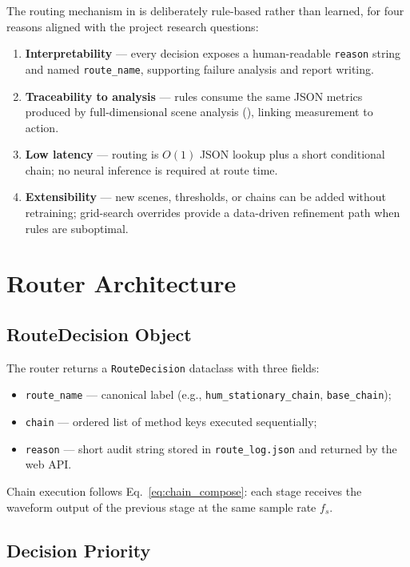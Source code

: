 The routing mechanism in \projectshort{} is deliberately rule-based rather than learned, for four reasons aligned with the project research questions:
\begin{enumerate}
  \item \textbf{Interpretability} --- every decision exposes a human-readable \texttt{reason} string and named \texttt{route\_name}, supporting failure analysis and report writing.
  \item \textbf{Traceability to analysis} --- rules consume the same JSON metrics produced by full-dimensional scene analysis (), linking measurement to action.
  \item \textbf{Low latency} --- routing is $O(1)$ JSON lookup plus a short conditional chain; no neural inference is required at route time.
  \item \textbf{Extensibility} --- new scenes, thresholds, or chains can be added without retraining; grid-search overrides provide a data-driven refinement path when rules are suboptimal.
\end{enumerate}

\section{Router Architecture}
\label{sec:router_arch}

\subsection{RouteDecision Object}

The router returns a \texttt{RouteDecision} dataclass with three fields:
\begin{itemize}
  \item \texttt{route\_name} --- canonical label (e.g., \texttt{hum\_stationary\_chain}, \texttt{base\_chain});
  \item \texttt{chain} --- ordered list of method keys executed sequentially;
  \item \texttt{reason} --- short audit string stored in \texttt{route\_log.json} and returned by the web API.
\end{itemize}

Chain execution follows Eq.~\eqref{eq:chain_compose}: each stage receives the waveform output of the previous stage at the same sample rate $f_s$.

\subsection{Decision Priority}

